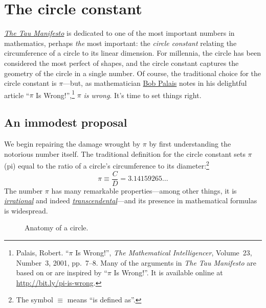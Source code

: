 \section{The circle constant} %
\label{sec:the_circle_constant}

\href{http://tauday.com/tau-manifesto}{\emph{The Tau Manifesto}} is dedicated to one of the most important numbers in mathematics, perhaps \emph{the} most important: the \emph{circle constant} relating the circumference of a circle to its linear dimension. For millennia, the circle has been considered the most perfect of shapes, and the circle constant captures the geometry of the circle in a single number. Of course, the traditional choice for the circle constant is $\pi$---but, as mathematician \href{http://www.math.utah.edu/~palais}{Bob Palais} notes in his delightful article ``$\pi$ Is Wrong!'',\footnote{Palais, Robert. ``$\pi$ Is Wrong!'', \emph{The Mathematical Intelligencer}, Volume~23, Number~3, 2001, pp.~7--8. Many of the arguments in \emph{The Tau Manifesto} are based on or are inspired by ``$\pi$ Is Wrong!''. It is available online at \href{http://www.math.utah.edu/~palais/pi.html}{http://bit.ly/pi-is-wrong}.} $\pi$ \emph{is wrong}. It's time to set things right.

  \subsection{An immodest proposal} %
  \label{sec:an_immodest_proposal}

We begin repairing the damage wrought by $\pi$ by first understanding the notorious number itself. The traditional definition for the circle constant sets $\pi$ (pi) equal to the ratio of a circle's circumference to its diameter:\footnote{The symbol $\equiv$ means ``is defined as''.}
\[
  \pi \equiv \frac{C}{D} = 3.14159265\ldots
\]
The number $\pi$ has many remarkable properties---among other things, it is \href{http://en.wikipedia.org/wiki/Irrational_number}{\emph{irrational}} and indeed \href{http://en.wikipedia.org/wiki/Transcendental_number}{\emph{transcendental}}---and its presence in mathematical formulas is widespread.

\begin{figure}
\caption{Anatomy of a circle.\label{fig:circle}}
\end{figure}

